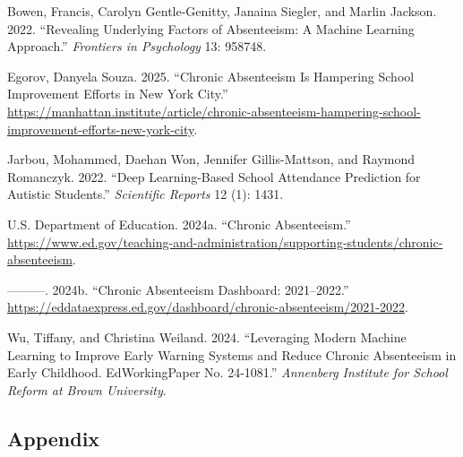 \documentclass[
  11pt,
]{article}
\newlength{\cslhangindent}
\newenvironment{CSLReferences}[2] %
 {\begin{list}{}{%
  \setlength{\itemindent}{0pt}
  \setlength{\leftmargin}{0pt}
  \setlength{\parsep}{0pt}
  \ifodd #1
   \setlength{\leftmargin}{\cslhangindent}
   \setlength{\itemindent}{-1\cslhangindent}
  \fi
  \setlength{\itemsep}{#2\baselineskip}}}
 {\end{list}}
\begin{document}
\label{refs}
\begin{CSLReferences}{1}{0}
Bowen, Francis, Carolyn Gentle-Genitty, Janaina Siegler, and Marlin
Jackson. 2022. {``Revealing Underlying Factors of Absenteeism: A Machine
Learning Approach.''} \emph{Frontiers in Psychology} 13: 958748.

Egorov, Danyela Souza. 2025. {``Chronic Absenteeism Is Hampering School
Improvement Efforts in New York City.''}
\url{https://manhattan.institute/article/chronic-absenteeism-hampering-school-improvement-efforts-new-york-city}.

Jarbou, Mohammed, Daehan Won, Jennifer Gillis-Mattson, and Raymond
Romanczyk. 2022. {``Deep Learning-Based School Attendance Prediction for
Autistic Students.''} \emph{Scientific Reports} 12 (1): 1431.

U.S. Department of Education. 2024a. {``Chronic Absenteeism.''}
\url{https://www.ed.gov/teaching-and-administration/supporting-students/chronic-absenteeism}.

---------. 2024b. {``Chronic Absenteeism Dashboard: 2021--2022.''}
\url{https://eddataexpress.ed.gov/dashboard/chronic-absenteeism/2021-2022}.

Wu, Tiffany, and Christina Weiland. 2024. {``Leveraging Modern Machine
Learning to Improve Early Warning Systems and Reduce Chronic Absenteeism
in Early Childhood. EdWorkingPaper No. 24-1081.''} \emph{Annenberg
Institute for School Reform at Brown University}.

\end{CSLReferences}

\newpage

\subsection{Appendix}\label{appendix}
\end{document}
